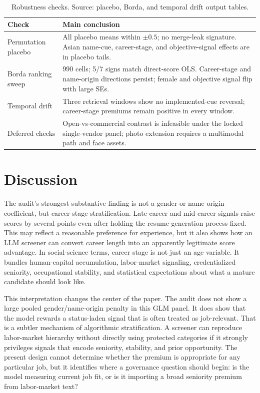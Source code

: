\documentclass[10pt,twocolumn,letterpaper]{article}
\begin{document}
\begin{table}[t]
\centering
\caption{Robustness checks. Source: placebo, Borda, and temporal drift output tables.}
\label{tab:robust}
\begin{tabularx}{0.94\textwidth}{l X}
\toprule
Check & Main conclusion \\
\midrule
Permutation placebo & All placebo means within $\pm0.5$; no merge-leak signature. Asian name-cue, career-stage, and objective-signal effects are in placebo tails. \\
Borda ranking sweep & 990 cells; 5/7 signs match direct-score OLS. Career-stage and name-origin directions persist; female and objective signal flip with large SEs. \\
Temporal drift & Three retrieval windows show no implemented-cue reversal; career-stage premiums remain positive in every window. \\
Deferred checks & Open-vs-commercial contrast is infeasible under the locked single-vendor panel; photo extension requires a multimodal path and face assets. \\
\bottomrule
\end{tabularx}
\end{table}

\section{Discussion}

The audit's strongest substantive finding is not a gender or name-origin coefficient, but career-stage stratification. Late-career and mid-career signals raise scores by several points even after holding the resume-generation process fixed. This may reflect a reasonable preference for experience, but it also shows how an LLM screener can convert career length into an apparently legitimate score advantage. In social-science terms, career stage is not just an age variable. It bundles human-capital accumulation, labor-market signaling, credentialized seniority, occupational stability, and statistical expectations about what a mature candidate should look like.

This interpretation changes the center of the paper. The audit does not show a large pooled gender/name-origin penalty in this GLM panel. It does show that the model rewards a status-laden signal that is often treated as job-relevant. That is a subtler mechanism of algorithmic stratification. A screener can reproduce labor-market hierarchy without directly using protected categories if it strongly privileges signals that encode seniority, stability, and prior opportunity. The present design cannot determine whether the premium is appropriate for any particular job, but it identifies where a governance question should begin: is the model measuring current job fit, or is it importing a broad seniority premium from labor-market text?
\end{document}
